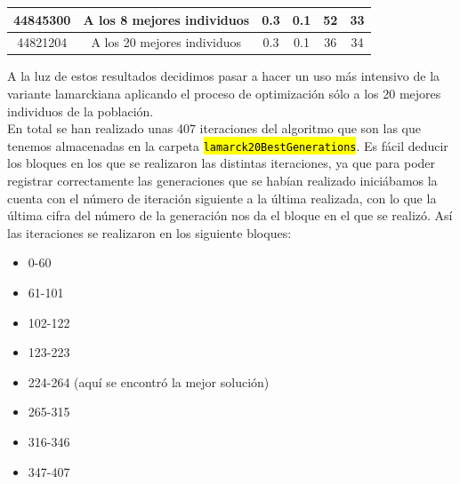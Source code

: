 \documentclass[10pt,a4paper]{article}
\newcommand{\archive}[1]{\sethlcolor{light-green}\hl{\texttt{#1}}} %
\begin{document}
\begin{center}
\begin{table}[H]
\begin{tabular}{|l|c|c|c|c|c|}
\multicolumn{1}{|c|}{44845300} & A los 8 mejores individuos  & 0.3                                                            & 0.1                                                               & 52                                                                          & 33                                                                                  \\ \hline
\multicolumn{1}{|c|}{44821204} & A los 20 mejores individuos & 0.3                                                            & 0.1                                                               & 36                                                                          & 34                                                                                  \\ \hline
\end{tabular}
\end{table}
\end{center}

A la luz de estos resultados decidimos pasar a hacer un uso más intensivo de la variante lamarckiana aplicando el proceso de optimización sólo a los 20 mejores individuos de la población.\\

En total se han realizado unas 407 iteraciones del algoritmo que son las que tenemos almacenadas en la carpeta \archive{lamarck20BestGenerations}. Es fácil deducir los bloques en los que se realizaron las distintas iteraciones, ya que para poder registrar correctamente las generaciones que se habían realizado iniciábamos la cuenta con el número de iteración siguiente a la última realizada, con lo que la última cifra del número de la generación nos da el bloque en el que se realizó. Así las iteraciones se realizaron en los siguiente bloques:

\begin{itemize}
\item 0-60
\item 61-101
\item 102-122
\item 123-223
\item 224-264 (aquí se encontró la mejor solución)
\item 265-315
\item 316-346
\item 347-407
\end{itemize}
\end{document}
